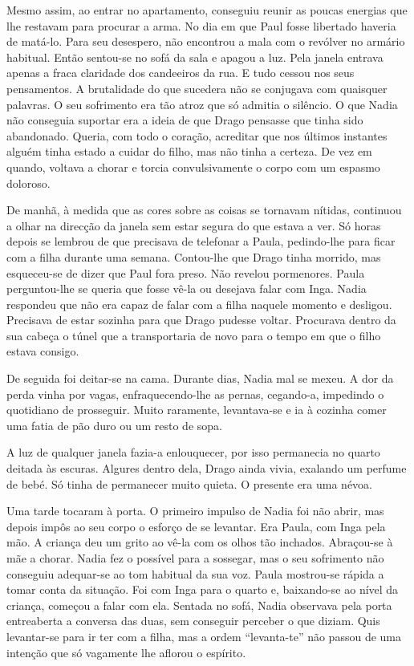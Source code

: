 Mesmo assim, ao entrar no apartamento, conseguiu
reunir as poucas energias que lhe restavam para procurar a arma. No dia
em que Paul fosse libertado haveria de matá-lo. Para seu desespero, não
encontrou a mala com o
revólver no armário habitual. Então sentou-se no sofá da sala e apagou a
luz. Pela janela entrava apenas a fraca claridade dos candeeiros da rua.
E tudo cessou nos seus pensamentos. A brutalidade do que sucedera não se
conjugava com quaisquer palavras. O seu sofrimento era tão atroz que
só admitia o silêncio. O que Nadia não conseguia suportar era a ideia
de que Drago pensasse que tinha sido abandonado. Queria, com todo o
coração, acreditar que nos últimos instantes alguém tinha estado a
cuidar do filho, mas não tinha a certeza. De vez em quando, voltava a
chorar e torcia convulsivamente o corpo com um espasmo doloroso.

De manhã, à medida que as cores sobre as coisas se tornavam nítidas,
continuou a olhar na direcção da janela sem estar segura do que estava a
ver. Só horas depois se lembrou de que precisava de telefonar a Paula,
pedindo-lhe para ficar com a filha durante uma semana. Contou-lhe que
Drago tinha morrido, mas esqueceu-se de dizer que Paul fora preso. Não
revelou pormenores. Paula perguntou-lhe se queria que fosse vê-la ou desejava falar com Inga. Nadia
respondeu que não era capaz de falar com a filha naquele momento e
desligou. Precisava de estar sozinha para que Drago pudesse voltar.
Procurava dentro da sua cabeça o túnel que a transportaria de novo para
o tempo em que o filho estava consigo.

De seguida foi deitar-se na cama. Durante dias, Nadia mal se mexeu. A
dor da perda vinha por vagas, enfraquecendo-lhe as pernas, cegando-a,
impedindo o quotidiano de prosseguir. Muito raramente, levantava-se e
ia à cozinha comer uma fatia de pão duro ou um resto de sopa.

A luz de qualquer janela fazia-a enlouquecer, por isso permanecia no
quarto deitada às escuras. Algures dentro dela, Drago ainda vivia,
exalando um perfume de bebé. Só tinha de permanecer muito quieta. O
presente era uma névoa.

Uma tarde tocaram à porta. O primeiro impulso de Nadia foi não abrir,
mas depois impôs ao seu corpo o esforço de se levantar. Era Paula, com
Inga pela mão. A criança deu um grito ao vê-la com os olhos tão
inchados. Abraçou-se à mãe a chorar. Nadia fez o possível para a
sossegar, mas o seu sofrimento não conseguiu adequar-se ao tom habitual
da sua voz. Paula mostrou-se rápida a tomar conta da situação. Foi com
Inga para o quarto e, baixando-se ao nível da criança, começou a falar com ela. Sentada no sofá, Nadia
observava pela porta entreaberta a conversa das duas, sem conseguir
perceber o que diziam. Quis levantar-se para ir ter com a filha, mas a
ordem ``levanta-te'' não passou de uma intenção que só vagamente lhe
aflorou o espírito.

